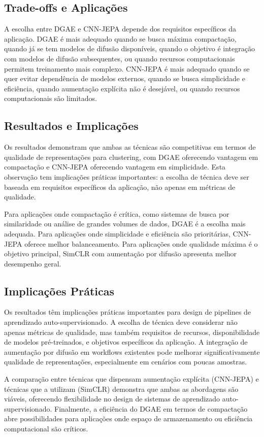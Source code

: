 \subsection{Trade-offs e Aplicações}

A escolha entre DGAE e CNN-JEPA depende dos requisitos específicos da aplicação. DGAE é mais adequado quando se busca máxima compactação, quando já se tem modelos de difusão disponíveis, quando o objetivo é integração com modelos de difusão subsequentes, ou quando recursos computacionais permitem treinamento mais complexo. CNN-JEPA é mais adequado quando se quer evitar dependência de modelos externos, quando se busca simplicidade e eficiência, quando aumentação explícita não é desejável, ou quando recursos computacionais são limitados.

\subsection{Resultados e Implicações}

Os resultados demonstram que ambas as técnicas são competitivas em termos de qualidade de representações para clustering, com DGAE oferecendo vantagem em compactação e CNN-JEPA oferecendo vantagem em simplicidade. Esta observação tem implicações práticas importantes: a escolha de técnica deve ser baseada em requisitos específicos da aplicação, não apenas em métricas de qualidade.

Para aplicações onde compactação é crítica, como sistemas de busca por similaridade ou análise de grandes volumes de dados, DGAE é a escolha mais adequada. Para aplicações onde simplicidade e eficiência são prioritárias, CNN-JEPA oferece melhor balanceamento. Para aplicações onde qualidade máxima é o objetivo principal, SimCLR com aumentação por difusão apresenta melhor desempenho geral.

\subsection{Implicações Práticas}

Os resultados têm implicações práticas importantes para design de pipelines de aprendizado auto-supervisionado. A escolha de técnica deve considerar não apenas métricas de qualidade, mas também requisitos de recursos, disponibilidade de modelos pré-treinados, e objetivos específicos da aplicação. A integração de aumentação por difusão em workflows existentes pode melhorar significativamente qualidade de representações, especialmente em cenários com poucas amostras.

A comparação entre técnicas que dispensam aumentação explícita (CNN-JEPA) e técnicas que a utilizam (SimCLR) demonstra que ambas as abordagens são viáveis, oferecendo flexibilidade no design de sistemas de aprendizado auto-supervisionado. Finalmente, a eficiência do DGAE em termos de compactação abre possibilidades para aplicações onde espaço de armazenamento ou eficiência computacional são críticos.
